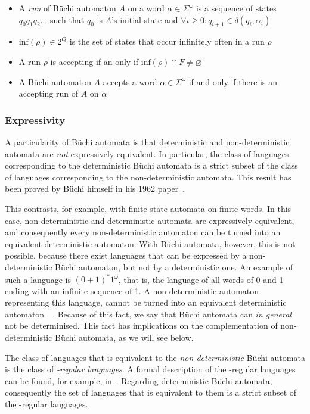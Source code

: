 \begin{itemize}
\item A \emph{run} of Büchi automaton $A$ on a word $\alpha \in \Sigma^\omega$ is a sequence of states $q_0q_1q_2\dots$ such that $q_0$ is $A$'s initial state and $\forall i \geq 0: q_{i+1} \in \delta(q_i, \alpha_i)$
\item $\textrm{inf}(\rho) \in 2^Q$ is the set of states that occur infinitely often in a run $\rho$
\item A run $\rho$ is accepting if an only if $\textrm{inf}(\rho) \cap F \neq \varnothing$
\item A Büchi automaton $A$ accepts a word $\alpha \in \Sigma^\omega$ if and only if there is an accepting run of $A$ on $\alpha$
\end{itemize}


\subsubsection{Expressivity}
A particularity of Büchi automata is that deterministic and non-deterministic automata are \textit{not} expressively equivalent. In particular, the class of languages corresponding to the deterministic Büchi automata is a strict subset of the class of languages corresponding to the non-deterministic automata. This result has been proved by Büchi himself in his 1962 paper~\cite{buchi1960decision}.

This contrasts, for example, with finite state automata on finite words. In this case, non-deterministic and deterministic automata are expressively equivalent, and consequently every non-deterministic automaton can be turned into an equivalent deterministic automaton. With Büchi automata, however, this is not possible, because there exist languages that can be expressed by a non-deterministic Büchi automaton, but not by a deterministic one. An example of such a language is $(0+1)^*1^\omega$, that is, the language of all words of 0 and 1 ending with an infinite sequence of 1. A non-deterministic automaton representing this language, cannot be turned into an equivalent deterministic automaton~~\cite{1996_vardi, 2002_roggenbach}. Because of this fact, we say that Büchi automata can \textit{in general} not be determinised. This fact has implications on the complementation of non-deterministic Büchi automata, as we will see below.

The class of languages that is equivalent to the \textit{non-deterministic} Büchi automata is the class of \textit{\om-regular languages}. A formal description of the \om-regular languages can be found, for example, in~\cite{Thomas:1991,1996_thomas,2014_wilke}. Regarding deterministic Büchi automata, consequently the set of languages that is equivalent to them is a strict subset of the \om-regular languages.

